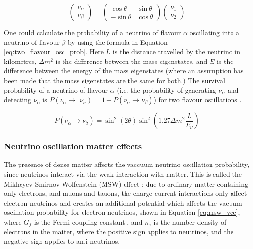 $$
\left(\begin{array}{l}
\nu_{\alpha} \\
\nu_{\beta}
\end{array}\right)=\left(\begin{array}{cc}
\cos \theta & \sin \theta \\
-\sin \theta & \cos \theta
\end{array}\right)\left(\begin{array}{l}
\nu_{1} \\
\nu_{2}
\end{array}\right)
\label{eq:rotation matrix}
$$


One could calculate the probability of a neutrino of flavour $\alpha$ oscillating into a neutrino of flavour $\beta$ by using the formula in Equation \ref{eq:two_flavour_osc_prob}. Here $L$ is the distance travelled by the neutrino in kilometres, $\Delta m^{2}$ is the difference between the mass eigenstates, and $E$ is the difference between the energy of the mass eigenstates (where an assumption has been made that the mass eigenstates are the same for both.) The survival probability of a neutrino of flavour $\alpha$ (i.e. the probability of generating $\nu_{\alpha}$ and detecting $\nu_{\alpha}$ is $P\left(\nu_{\alpha} \rightarrow\right.$ $\left.\nu_{\alpha}\right)=1-P\left(\nu_{\alpha} \rightarrow \nu_{\beta}\right)$) for two flavour oscillations \cite{RevModPhys.59.671}. 

\begin{equation}
P\left(\nu_{\alpha} \rightarrow \nu_{\beta}\right)=\sin ^{2}(2 \theta) \sin ^{2}\left(1.27 \Delta m^{2} \frac{L}{E_{\nu}}\right)
\label{eq:two_flavour_osc_prob}
\end{equation}

\subsubsection{Neutrino oscillation matter effects}

The presence of dense matter affects the vaccuum neutrino oscillation probability, since neutrinos interact via the weak interaction with matter. This is called the Mikheyev-Smirnov-Wolfenstein (MSW) effect \cite{Smirnov_2005}: due to ordinary matter containing only electrons, and muons and tauons, the charge current interactions only affect electron neutrinos and creates an additional potential which affects the vacuum oscillation probability for electron neutrinos, shown in Equation \ref{eq:msw_vcc}, where $G_{f}$ is the Fermi coupling constant \cite{van2000precise}, and $n_{e}$ is the number density of electrons in the matter, where the positive sign applies to neutrinos, and the negative sign applies to anti-neutrinos. 

